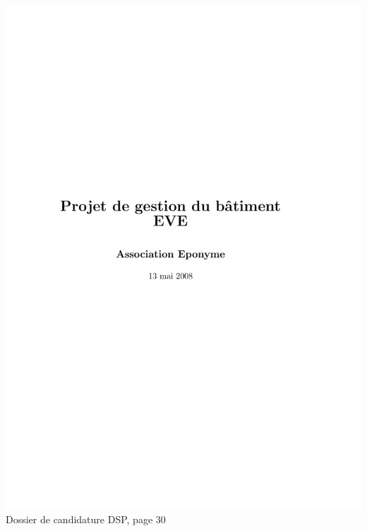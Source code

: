 \includegraphics[scale=0.85,trim=20mm 20mm 20mm 20mm,clip,page=30]{annexes/candidature_dsp.pdf} \\
Dossier de candidature DSP, page 30
\newpage
